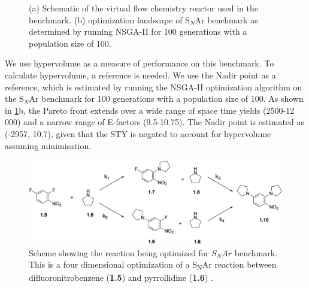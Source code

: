 \begin{figure}
    \centering
    \caption{(a) Schematic of the virtual flow chemistry reactor used in the benchmark. (b) optimization landscape of S$_N$Ar benchmark as determined by running NSGA-II for 100 generations with a population size of 100.}
    \label{fig:snar}

\end{figure}

We use hypervolume as a measure of performance on this benchmark. To calculate hypervolume, a reference is needed. We use the Nadir point as a reference, which is estimated by running the NSGA-II optimization algorithm\cite{Deb2002} on the S$_N$Ar benchmark for 100 generations with a population size of 100. As shown in \ref{fig:snar}b, the Pareto front  extends over a wide range of space time yields (2500-12 000) and a narrow range of E-factors (9.5-10.75). The Nadir point is estimated as (-2957, 10.7), given that the STY is negated to account for hypervolume assuming minimisation.

\begin{figure}
    \centering
    \includegraphics[width=\textwidth]{gfx/Chapter02/snar_benchmark_scheme_thesis.png}
    \caption{Scheme showing the reaction being optimized for $S_NAr$ benchmark. This is a four dimensional optimization of a  S\textsubscript{N}Ar reaction between difluoronitrobenzene (\textbf{1.5}) and pyrrollidine (\textbf{1.6}) \cite{Hone2017}.}
    \label{fig:snar_benchmark}
\end{figure}

